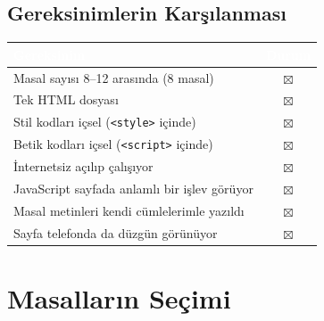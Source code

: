 \documentclass[12pt,a4paper]{article}
\begin{document}
\subsection{Gereksinimlerin Karşılanması}
\begin{center}
\begin{tabular}{@{}p{8.2cm}c@{}}
\toprule
\rowcolor{ana}\textcolor{white}{\textbf{Gereksinim}} & \textcolor{white}{\textbf{Durum}} \\
\midrule
Masal sayısı 8--12 arasında (8 masal)               & $\boxtimes$ \\
Tek HTML dosyası                                    & $\boxtimes$ \\
Stil kodları içsel (\texttt{<style>} içinde)        & $\boxtimes$ \\
Betik kodları içsel (\texttt{<script>} içinde)      & $\boxtimes$ \\
İnternetsiz açılıp çalışıyor                        & $\boxtimes$ \\
JavaScript sayfada anlamlı bir işlev görüyor        & $\boxtimes$ \\
Masal metinleri kendi cümlelerimle yazıldı          & $\boxtimes$ \\
Sayfa telefonda da düzgün görünüyor                 & $\boxtimes$ \\
\bottomrule
\end{tabular}
\end{center}

\section{Masalların Seçimi}
\end{document}
